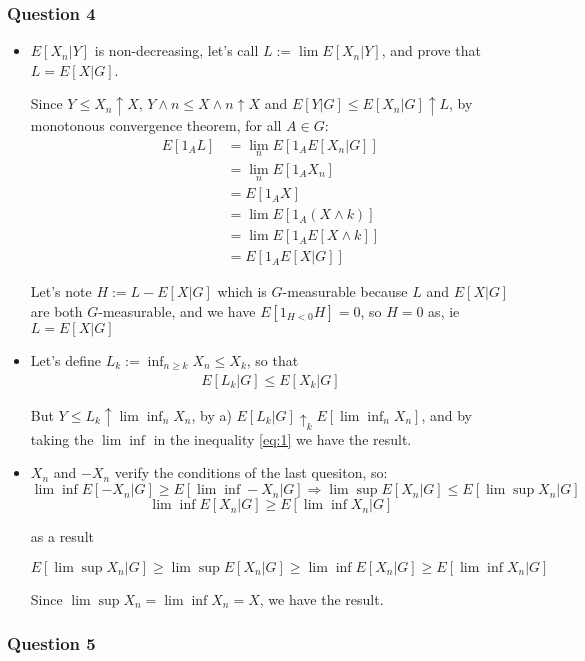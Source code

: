 \documentclass[12pt]{article}
\newcommand{\Q}[1]{\subsubsection*{Question #1}}
\begin{document}
\Q{4}

\begin{itemize}
\item 

$E[X_n|Y]$ is non-decreasing, let's call $L := \lim E[X_n|Y]$, and prove that $L = E[X|G]$.

Since $Y \le X_n \uparrow X$, $Y\wedge n \le X \wedge n\uparrow X $  and $E[Y|G] \le E[X_n|G] \uparrow L$, by monotonous convergence theorem, for all $A \in G$:
\begin{align*}
E[1_A L] &= \lim_n E[1_A  E[X_n|G]] \\&= \lim_n E[1_A X_n] \\&= E[1_A X] \\&= \lim E[1_A (X \wedge k) ] \\&= \lim E[1_A E[X \wedge k]] \\&= E[1_A E[X|G]]
\end{align*}


Let's note $H := L - E[X|G]$ which is $G$-measurable because $L$ and $E[X | G]$ are both $G$-measurable, and we have $E[1_{H < 0} H] = 0$, so $H = 0$ as, ie $L = E[X|G]$

\item
Let's define $L_k := \inf_{n \ge k} X_n \le X_k$, so that 
\begin{align}\label{eq:1}
E[L_k|G]  \le E[X_k|G]
\end{align}

But $Y \le L_k \uparrow \lim \inf_n X_n$, by a) $E[L_k|G] \uparrow_k E[\lim \inf_n X_n]$, and by taking the $\lim\inf$ in the inequality \ref{eq:1} we have the result.

\item 

$X_n$ and $-X_n$ verify the conditions of the last quesiton, so:
$$\lim \inf E[-X_n|G] \ge E[\lim \inf -X_n|G] \Rightarrow \lim \sup E[X_n|G] \le E[\lim \sup X_n|G] $$
$$\lim \inf E[X_n|G] \ge E[\lim \inf X_n|G]$$

as a result 

$$  E[\lim \sup X_n|G] \ge  \lim \sup E[X_n|G] \ge \lim \inf E[X_n|G] \ge E[\lim \inf X_n|G]$$

Since $\lim \sup X_n = \lim \inf X_n = X$, we have the result.
\end{itemize}

\Q{5}
\end{document}
